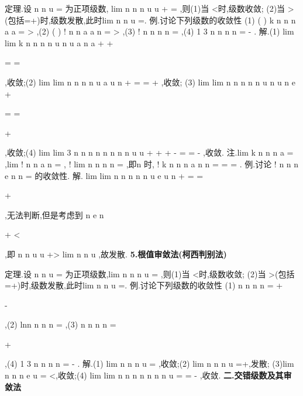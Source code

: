 \textcolor{lyred}{定理}.设
n
n
u
\infty 
=\sum 
为正项级数,
lim
n
n
n
u
u
\rho 
+
\to \infty 
=
,则(1)当
\rho <时,级数收敛; 
(2)当
\rho >(包括\rho =+\infty )时,级数发散,此时lim
n
n
u
\to \infty 
=\infty . 
\textcolor{lyred}{例}.讨论下列级数的收敛性 
(1)
(
)
k
n
n
n
a
a
\infty 
=
>
\sum 
,(2)
(
)
!
n
n
a
a
n
\infty 
=
>
\sum 
,(3)
!
n
n
n
n
\infty 
=\sum 
,(4)
1 3
n
n
n
n
\infty 
=
-
\sum 
. 
解.(1)
lim
lim
k
n
n
n
n
u
n
u
a
n
a
+
\to \infty 
\to \infty 
+


=
=




,收敛;(2)
lim
lim
n
n
n
n
u
a
u
n
+
\to \infty 
\to \infty 
=
=
+
,收敛; 
(3)
lim
lim
n
n
n
n
n
u
n
u
n
e
+
\to \infty 
\to \infty 


=
=


+


,收敛;(4)
lim
lim 3
n
n
n
n
n
n
n
n
u
u
+
+
+
\to \infty 
\to \infty 
-
=
=
-
,收敛. 
\textcolor{lyred}{注}.lim
k
n
n
n
a
\to \infty 
=
,lim
!
n
n
a
n
\to \infty 
=
,
!
lim
n
n
n
n
\to \infty 
=
,即n \to \infty 时,
!
k
n
n
n
a
n
n
=
=
=
. 
\textcolor{lyred}{例}.讨论
!
n
n
n
e
n
n
\infty 
=
\cdots 
\sum 
的收敛性. 
解.
lim
lim
n
n
n
n
n
u
e
u
n
+
\to \infty 
\to \infty 
=
=


+




,无法判断,但是考虑到
n
e
n


+
<




,即
n
n
u
u
+>\Rightarrow  
lim
n
n
u
\to \infty 
\neq 
,故发散. 
{\bfseries \textcolor{lyred}{5.根值审敛法(柯西判别法)}}

\textcolor{lyred}{定理}.设
n
n
u
\infty 
=\sum 
为正项级数,lim n
n
n
u
\rho 
\to \infty 
=
,则(1)当
\rho <时,级数收敛; 
(2)当
\rho >(包括\rho =+\infty )时,级数发散,此时lim
n
n
u
\to \infty 
=\infty . 
\textcolor{lyred}{例}.讨论下列级数的收敛性 
(1)
n
n
n
n
\infty 
=
+




-


\sum 
,(2) 
lnn
n
n
n
\infty 
=\sum 
,(3)
n
n
n
n
\infty 
=


+




\sum 
,(4)
1 3
n
n
n
n
\infty 
=
-
\sum 
. 
解.(1)
lim
n
n
n
u
\to \infty 
=
,收敛;(2) lim n
n
n
u
\to \infty 
=+\infty ,发散; 
(3)lim
n
n
n
e
u
\to \infty 
=
<,收敛;(4)
lim
lim
n
n
n
n
n
n
n
u
\to \infty 
\to \infty 
=
=
-
,收敛. 
\vspace{4pt}
{\bfseries \textcolor{lyred}{二.交错级数及其审敛法}}

